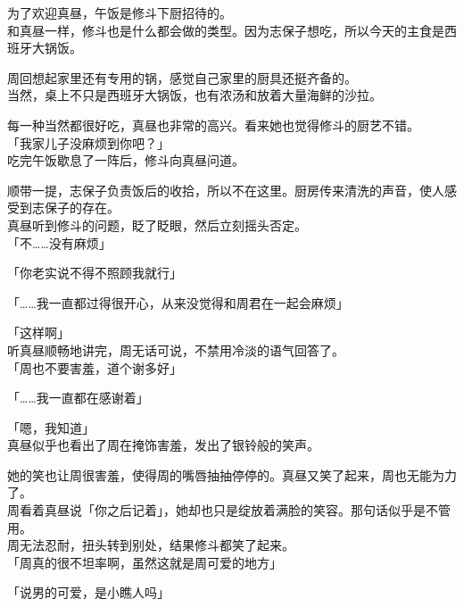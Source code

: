 \vspace{2\baselineskip}

为了欢迎真昼，午饭是修斗下厨招待的。\\

和真昼一样，修斗也是什么都会做的类型。因为志保子想吃，所以今天的主食是西班牙大锅饭。

周回想起家里还有专用的锅，感觉自己家里的厨具还挺齐备的。\\

当然，桌上不只是西班牙大锅饭，也有浓汤和放着大量海鲜的沙拉。

每一种当然都很好吃，真昼也非常的高兴。看来她也觉得修斗的厨艺不错。\\

「我家儿子没麻烦到你吧？」\\

吃完午饭歇息了一阵后，修斗向真昼问道。

顺带一提，志保子负责饭后的收拾，所以不在这里。厨房传来清洗的声音，使人感受到志保子的存在。\\

真昼听到修斗的问题，眨了眨眼，然后立刻摇头否定。\\

「不……没有麻烦」

「你老实说不得不照顾我就行」

「……我一直都过得很开心，从来没觉得和周君在一起会麻烦」

「这样啊」\\

听真昼顺畅地讲完，周无话可说，不禁用冷淡的语气回答了。\\

「周也不要害羞，道个谢多好」

「……我一直都在感谢着」

「嗯，我知道」\\

真昼似乎也看出了周在掩饰害羞，发出了银铃般的笑声。

她的笑也让周很害羞，使得周的嘴唇抽抽停停的。真昼又笑了起来，周也无能为力了。\\

周看着真昼说「你之后记着」，她却也只是绽放着满脸的笑容。那句话似乎是不管用。\\

周无法忍耐，扭头转到别处，结果修斗都笑了起来。\\

「周真的很不坦率啊，虽然这就是周可爱的地方」

「说男的可爱，是小瞧人吗」

